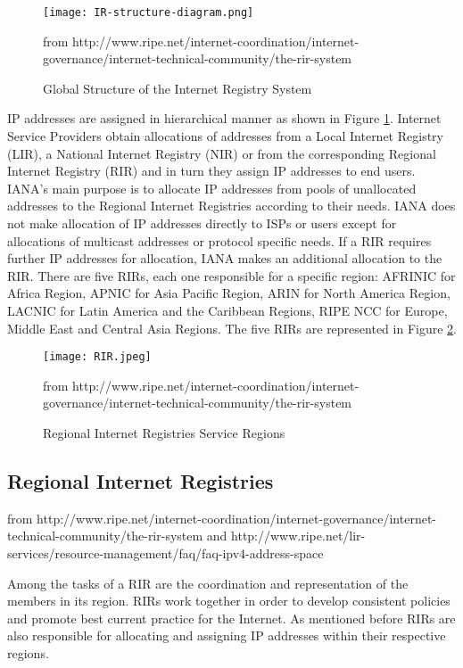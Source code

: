 \documentclass[11pt]{report}
\begin{document}
\begin{figure}[h!]
\centering
\texttt{[image: IR-structure-diagram.png]}
\caption{Global Structure of the Internet Registry System}
from http://www.ripe.net/internet-coordination/internet-governance/internet-technical-community/the-rir-system
\label{fig:ir_structure_diagram}
\end{figure}

IP addresses are assigned in hierarchical manner as shown in Figure \ref{fig:ir_structure_diagram}. Internet Service Providers obtain allocations of addresses from a Local Internet Registry (LIR), a National Internet Registry (NIR) or from the corresponding Regional Internet Registry (RIR) and in turn they assign IP addresses to end users. IANA's main purpose is to allocate IP addresses from pools of unallocated addresses to the Regional Internet Registries according to their needs. IANA does not make allocation of IP addresses directly to ISPs or users except for allocations of multicast addresses or protocol specific needs. If a RIR requires further IP addresses for allocation, IANA makes an additional allocation to the RIR. There are five RIRs, each one responsible for a specific region: AFRINIC for Africa Region, APNIC for Asia Pacific Region, ARIN for North America Region, LACNIC for Latin America and the Caribbean Regions, RIPE NCC for Europe, Middle East and Central Asia Regions. The five RIRs are represented in Figure \ref{fig:rirs_image}.

\begin{figure}[h!]
\centering
\texttt{[image: RIR.jpeg]}
\caption{Regional Internet Registries Service Regions}
from http://www.ripe.net/internet-coordination/internet-governance/internet-technical-community/the-rir-system
\label{fig:rirs_image}
\end{figure}

\subsection{Regional Internet Registries}
from http://www.ripe.net/internet-coordination/internet-governance/internet-technical-community/the-rir-system and http://www.ripe.net/lir-services/resource-management/faq/faq-ipv4-address-space


Among the tasks of a RIR are the coordination and representation of the members in its region. RIRs work together in order to develop consistent policies and promote best current practice for the Internet. As mentioned before RIRs are also responsible for allocating and assigning IP addresses within their respective regions. 
\end{document}
